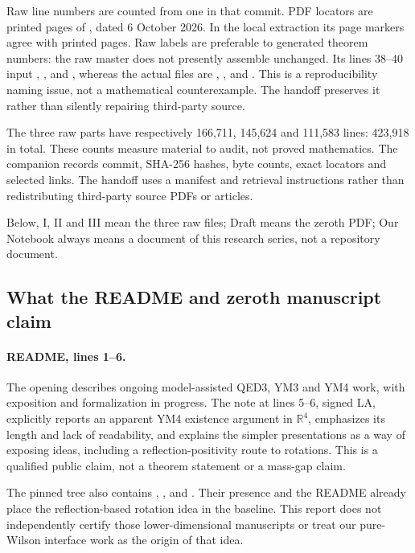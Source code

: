 Raw line numbers are counted from one in that commit.
PDF locators are printed pages of
, dated 6 October 2026.
In the local extraction its page markers agree with printed
pages. Raw labels are preferable to generated theorem numbers:
the raw master does not presently assemble unchanged.
Its lines 38--40 input
,
,
and ,
whereas the actual files are
,
, and
.
This is a reproducibility naming issue, not a mathematical
counterexample. The handoff preserves it rather than silently
repairing third-party source.

The three raw parts have respectively 166,711, 145,624 and
111,583 lines: 423,918 in total. These counts measure material
to audit, not proved mathematics. The companion
 records commit,
SHA-256 hashes, byte counts, exact locators and selected links.
The handoff uses a manifest and retrieval instructions rather
than redistributing third-party source PDFs or articles.

Below, I, II and III mean the three raw files; Draft means
the zeroth PDF; Our Notebook always means a document of
this research series, not a repository document.

\subsection{What the README and zeroth manuscript claim}
\label{hrb-claims}

\paragraph{README, lines 1--6.}
The opening describes ongoing model-assisted QED3, YM3 and
YM4 work, with exposition and formalization in progress.
The note at lines 5--6, signed LA, explicitly reports an
apparent YM4 existence argument in \(\mathbb R^4\), emphasizes
its length and lack of readability, and explains the simpler
presentations as a way of exposing ideas, including a
reflection-positivity route to rotations. This is a qualified
public claim, not a theorem statement or a mass-gap claim.

The pinned tree also contains
,
, and
. Their presence and the
README already place the reflection-based rotation
idea in the baseline. This report does not independently
certify those lower-dimensional manuscripts or treat
our pure-Wilson interface work as the origin of that idea.

